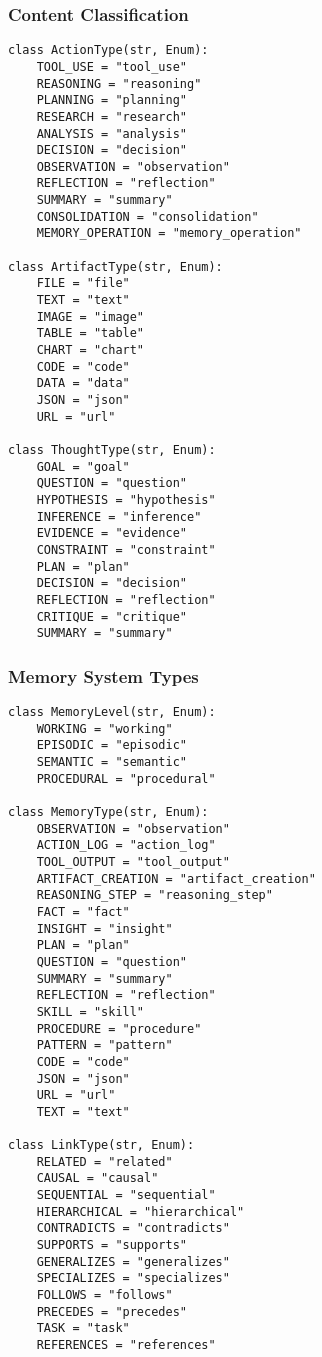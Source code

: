 \documentclass[12pt,a4paper]{article}
\begin{document}
\subsubsection*{Content Classification}
\begin{pageablecode}
\begin{verbatim}
class ActionType(str, Enum):
    TOOL_USE = "tool_use"
    REASONING = "reasoning"
    PLANNING = "planning"
    RESEARCH = "research"
    ANALYSIS = "analysis"
    DECISION = "decision"
    OBSERVATION = "observation"
    REFLECTION = "reflection"
    SUMMARY = "summary"
    CONSOLIDATION = "consolidation"
    MEMORY_OPERATION = "memory_operation"

class ArtifactType(str, Enum):
    FILE = "file"
    TEXT = "text"
    IMAGE = "image"
    TABLE = "table"
    CHART = "chart"
    CODE = "code"
    DATA = "data"
    JSON = "json"
    URL = "url"

class ThoughtType(str, Enum):
    GOAL = "goal"
    QUESTION = "question"
    HYPOTHESIS = "hypothesis"
    INFERENCE = "inference"
    EVIDENCE = "evidence"
    CONSTRAINT = "constraint"
    PLAN = "plan"
    DECISION = "decision"
    REFLECTION = "reflection"
    CRITIQUE = "critique"
    SUMMARY = "summary"
\end{verbatim}
\end{pageablecode}

\subsubsection*{Memory System Types}
\begin{pageablecode}
\begin{verbatim}
class MemoryLevel(str, Enum):
    WORKING = "working"
    EPISODIC = "episodic"
    SEMANTIC = "semantic"
    PROCEDURAL = "procedural"

class MemoryType(str, Enum):
    OBSERVATION = "observation"
    ACTION_LOG = "action_log"
    TOOL_OUTPUT = "tool_output"
    ARTIFACT_CREATION = "artifact_creation"
    REASONING_STEP = "reasoning_step"
    FACT = "fact"
    INSIGHT = "insight"
    PLAN = "plan"
    QUESTION = "question"
    SUMMARY = "summary"
    REFLECTION = "reflection"
    SKILL = "skill"
    PROCEDURE = "procedure"
    PATTERN = "pattern"
    CODE = "code"
    JSON = "json"
    URL = "url"
    TEXT = "text"

class LinkType(str, Enum):
    RELATED = "related"
    CAUSAL = "causal"
    SEQUENTIAL = "sequential"
    HIERARCHICAL = "hierarchical"
    CONTRADICTS = "contradicts"
    SUPPORTS = "supports"
    GENERALIZES = "generalizes"
    SPECIALIZES = "specializes"
    FOLLOWS = "follows"
    PRECEDES = "precedes"
    TASK = "task"
    REFERENCES = "references"
\end{verbatim}
\end{pageablecode}
\end{document}
